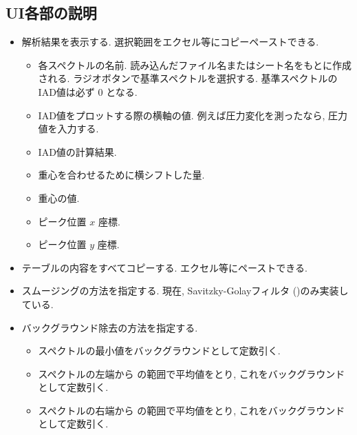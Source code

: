 \subsection{UI各部の説明}

\begin{itemize}
\item {} 解析結果を表示する. 選択範囲をエクセル等にコピーペーストできる.
  \begin{itemize}
  \item {} 各スペクトルの名前. 読み込んだファイル名またはシート名をもとに作成される.
    ラジオボタンで基準スペクトルを選択する. 基準スペクトルのIAD値は必ず $0$ となる.
  \item {} IAD値をプロットする際の横軸の値. 例えば圧力変化を測ったなら, 圧力値を入力する.
  \item {} IAD値の計算結果.
  \item {} 重心を合わせるために横シフトした量.
  \item {} 重心の値.
  \item {} ピーク位置 $x$ 座標.
  \item {} ピーク位置 $y$ 座標.
  \end{itemize}
\item {} テーブルの内容をすべてコピーする. エクセル等にペーストできる.
\end{itemize}

\vspace{1em}

\begin{itemize}
\item {} スムージングの方法を指定する. 現在, Savitzky-Golayフィルタ%
  ()のみ実装している.
\item {} バックグラウンド除去の方法を指定する.
  \begin{itemize}
  \item {} スペクトルの最小値をバックグラウンドとして定数引く.
  \item {} スペクトルの左端から  の範囲で平均値をとり,
    これをバックグラウンドとして定数引く.
  \item {} スペクトルの右端から  の範囲で平均値をとり,
    これをバックグラウンドとして定数引く.
  \end{itemize}
\end{itemize}

\vspace{1em}

